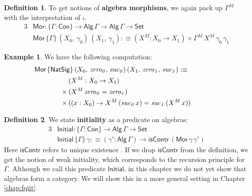 \documentclass[12pt,a4paper,twoside,openany]{book}
\theoremstyle{remark}
\theoremstyle{definition}
\newtheorem{mydefinition}{Definition}
\newtheorem{myexample}{Example}
\theoremstyle{theorem}
\newcommand{\mi}[1]{\mathit{#1}}
\newcommand{\ms}[1]{\mathsf{#1}}
\newcommand{\Con}{\mathsf{Con}}
\newcommand{\Set}{\mathsf{Set}}
\newcommand{\NatSig}{\mathsf{NatSig}}
\newcommand{\Alg}{\ms{Alg}}
\newcommand{\Mor}{\ms{Mor}}
\newcommand{\Initial}{\ms{Initial}}
\newcommand{\defn}{:\equiv}
\begin{document}
\begin{mydefinition}
\label{def:simple-morphism}
To get notions of \textbf{algebra morphisms}, we again pack up $\Gamma^M$ with
the interpretation of $\iota$.
\begin{alignat*}{3}
  & \Mor : \{\Gamma : \Con\} \to \Alg\,\Gamma \to \Alg\,\Gamma \to \Set \\
  & \Mor\,\{\Gamma\}\,(X_0,\,\gamma_0)\,(X_1,\,\gamma_1) \defn (X^M : X_0 \to X_1) \times \Gamma^M\,X^M\,\gamma_0\,\gamma_1
\end{alignat*}
\end{mydefinition}
\begin{myexample} We have the following computation:
\begin{alignat*}{3}
  & \hspace{-5em}\rlap{$\Mor\,\{\NatSig\}\,(X_0,\,\mi{zero_0},\,\mi{suc_0})\,(X_1,\,\mi{zero_1},\,\mi{suc_1}) \defn$} \\
           &(X^M : X_0 \to X_1) \\
   \times\,&(X^M\,\mi{zero_0} = \mi{zero_1}) \\
   \times\,&((x : X_0) \to X^M\,(\mi{suc_0}\,x) = \mi{suc_1}\,(X^M\,x))
\end{alignat*}
\end{myexample}

\begin{mydefinition} We state \textbf{initiality} as a predicate on algebras:
\begin{alignat*}{3}
  & \Initial : \{\Gamma : \Con\} \to \Alg\,\Gamma \to \Set\\
  & \Initial\,\{\Gamma\}\,\gamma \defn
    (\gamma' : \Alg\,\Gamma) \to \ms{isContr}\,(\Mor\,\gamma\,\gamma')
\end{alignat*}
Here $\ms{isContr}$ refers to unique existence \cite[Section 3.11]{hottbook}. If we drop
$\ms{isContr}$ from the definition, we get the notion of weak initiality, which
corresponds to the recursion principle for $\Gamma$. Although we call this
predicate $\Initial$, in this chapter we do not yet show that algebras form a
category. We will show this in a more general setting in Chapter \ref{chap:fqiit}.

\end{mydefinition}
\end{document}
